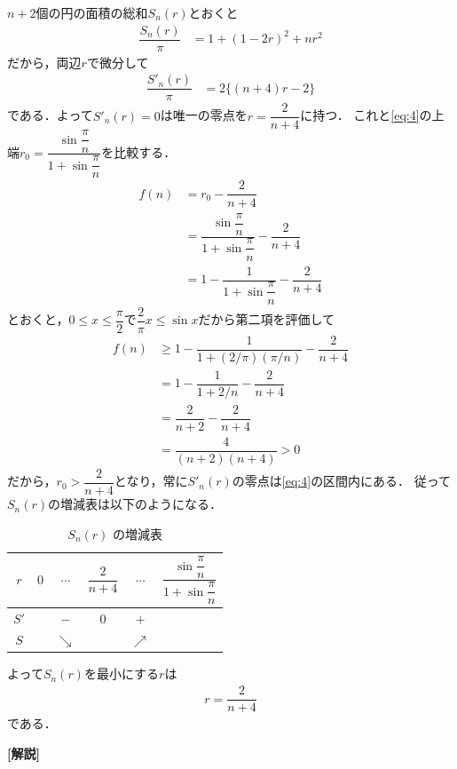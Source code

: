 \documentclass[../../main.tex]{subfiles}
\begin{document}
$n+2$個の円の面積の総和$S_n(r)$とおくと
\begin{align}
  \dfrac{S_n(r)}{\pi} &= 1 + (1-2r)^2 + nr^2  \label{eq:5}
\end{align}
だから，両辺$r$で微分して
\begin{align}
  \dfrac{S'_n(r)}{\pi} &= 2 \{(n+4)r - 2\} \label{eq:6}
\end{align}
である．よって$S'_n(r)=0$は唯一の零点を$r=\dfrac{2}{n+4}$に持つ．
これと\cref{eq:4}の上端$r_0= \dfrac{\sin \dfrac{\pi}{n}}{1+\sin \dfrac{\pi}{n}}$を比較する．
\begin{align}
  f(n) & = r_0 - \dfrac{2}{n+4} \\
  & = \dfrac{\sin \dfrac{\pi}{n}}{1+\sin \dfrac{\pi}{n}} - \dfrac{2}{n+4} \\
  & =   1 - \dfrac{1}{1+\sin \dfrac{\pi}{n}} - \dfrac{2}{n+4}
\end{align}
とおくと，$0 \le x \le \dfrac{\pi}{2}$で$\dfrac{2}{\pi}x \le \sin x$だから第二項を評価して
\begin{align}
  f(n) & \ge 1 - \dfrac{1}{1+(2/\pi)(\pi/n)} - \dfrac{2}{n+4} \\
  & = 1 - \dfrac{1}{1+2/n} - \dfrac{2}{n+4} \\
  & = \dfrac{2}{n+2} - \dfrac{2}{n+4} \\
  & = \dfrac{4}{(n+2)(n+4)} > 0
\end{align}
だから，$r_0 > \dfrac{2}{n+4}$となり，常に$S'_n(r)$の零点は\cref{eq:4}の区間内にある．
従って$S_n(r)$の増減表は以下のようになる．

\begin{table}[htb]
  \centering
  \caption{$S_n(r)$ の増減表}
  \begin{tabular}{|c|c|c|c|c|c|}
    \hline
    $r$ & $0$ & $\cdots$ & $\dfrac{2}{n+4}$ & $\cdots$ & $\dfrac{\sin \dfrac{\pi}{n}}{1+\sin \dfrac{\pi}{n}}$ \\
    \hline
    $S'$ & & $-$ & $0$ & $+$ & \\
    \hline
    $S$ & & $\searrow$ & & $\nearrow$ & \\
    \hline
  \end{tabular}
\end{table}

よって$S_n(r)$を最小にする$r$は
\begin{align}
  r = \dfrac{2}{n+4}
\end{align}
である．

{\bf [解説]}
\end{document}
